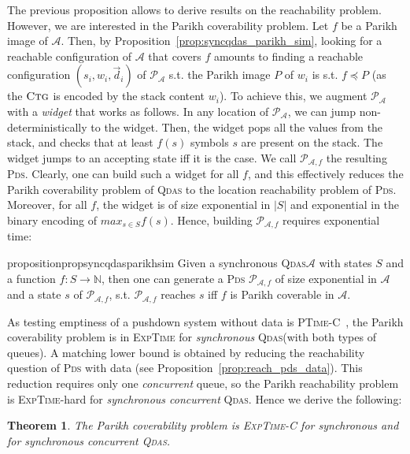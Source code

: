 \documentclass[runningheads,oribibl,]{article}
\newcommand{\mleq}{\preceq}
\newcommand{\Aa}{\ensuremath{\mathcal{A}}\xspace}
\newcommand{\Pp}{\ensuremath{\mathcal{P}}\xspace}
\newcommand{\NN}{\ensuremath{\mathbb{N}}\xspace}
\newcommand{\pds}{\textsc{Pds}\xspace}
\newcommand{\qdas}{\textsc{Qdas}\xspace}
\newcommand{\ptimecomplete}{\textsc{PTime-C}\xspace}
\newcommand{\dexptime}{\textsc{ExpTime}\xspace}
\newcommand{\dexptimecomplete}{\textsc{ExpTime-C}\xspace}
\newcommand{\Data}{\ensuremath{\vec{d}}}
\newcommand{\ctg}{\ensuremath{\textsc{Ctg}}\xspace}
\newtheorem{theorem}{Theorem}{}
\begin{document}
The previous proposition allows to derive results on the reachability
problem. However, we are interested in the Parikh coverability
problem. Let $f$ be a Parikh image of $\Aa$. Then, by
Proposition~\ref{prop:syncqdas_parikh_sim}, looking for a reachable
configuration of $\Aa$ that covers $f$ amounts to finding a reachable
configuration $(s_i,w_i,\Data_i)$ of $\Pp_\Aa$ s.t. the Parikh image
$P$ of $w_i$ is s.t.  $f\mleq P$ (as the \ctg is encoded by the stack
content $w_i$). To achieve this, we augment $\Pp_\Aa$ with a
\emph{widget} that works as follows. In any location of $\Pp_\Aa$, we
can jump non-deterministically to the widget. Then, the widget pops
all the values from the stack, and checks that at least $f(s)$ symbols
$s$ are present on the stack. The widget jumps to an accepting state
iff it is the case.  We call $\Pp_{\Aa,f}$ the resulting
\pds. Clearly, one can build such a widget for all $f$, and this
effectively reduces the Parikh coverability problem of \qdas to the
location reachability problem of \pds. Moreover, for all $f$, the
widget is of size exponential in $\vert S\vert$ and exponential
in the binary encoding of
 $max_{s\in S}f(s)$. Hence, building $\Pp_{\Aa,f}$
requires exponential time:

\begin{restatable}{proposition}{propsyncqdasparikhsim}
  \label{prop:syncqdas_parikh_sim}
  Given a synchronous \qdas $\Aa$ with states $S$ and a function
  \mbox{$f:S\rightarrow \NN$}, then one can generate a \pds
  $\Pp_{\Aa,f}$ of size exponential in $\Aa$ and a state $s$ of
  $\Pp_{\Aa,f}$, s.t. $\Pp_{\Aa,f}$ reaches $s$ iff $f$ is Parikh
  coverable in $\Aa$.
\end{restatable}

As testing emptiness of a pushdown system without data is
\ptimecomplete~\cite{bouajjani-a-1997-135-a}, the
Parikh coverability problem is in \dexptime for \emph{synchronous}
\qdas (with both types of queues). A matching lower bound is obtained
by reducing the reachability question of \pds with data (see
Proposition~\ref{prop:reach_pds_data}). This reduction requires only
one \emph{concurrent} queue, so the Parikh reachability problem is
\dexptime-hard for \emph{synchronous concurrent} \qdas. Hence we
derive the following:

\begin{theorem}\label{thm:syncqdas}
  The Parikh coverability problem is \dexptimecomplete for synchronous
  and for synchronous concurrent \qdas.
\end{theorem}
\end{document}

